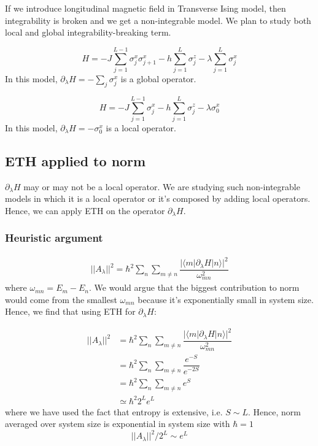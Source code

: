 \documentclass[11pt,a4paper]{article}
\begin{document}
If we introduce longitudinal magnetic field in Transverse Ising model, then integrability is broken and we get a non-integrable model. We plan to study both local  and global integrability-breaking term. 

\begin{equation}
H= -J \sum_{j=1}^{L-1} \sigma_j^x \sigma_{j+1}^x - h\sum_{j=1}^{L} \sigma_j^z -\lambda \sum_{j=1}^{L}\sigma_j^x 
\end{equation}
In this model, $\partial_{\lambda}H = - \sum_{j} \sigma_j^x  $ is a global operator.


\begin{equation}
H= -J  \sum_{j=1}^{L-1} \sigma_j^x - h \sum_{j=1}^{L}  \sigma_j^z -\lambda  \sigma_0^x 
\end{equation}
In this model, $\partial_{\lambda}H = -  \sigma_0^x  $ is a local operator.


\subsection{ETH applied to norm}
$\partial_{\lambda}H$ may or may not be a local operator. We are studying such non-integrable models in which it is a local operator or it's composed by adding local operators. Hence, we can apply ETH on the operator $\partial_{\lambda}H$.

\subsubsection{Heuristic argument}
\begin{align*}
||A_{\lambda}||^2= \hbar^2\sum_n \sum_{m \neq n}  \dfrac{|\langle m | \partial_{\lambda}H| n \rangle|^2}{\omega_{mn}^2}
\end{align*}
where $\omega_{mn}= E_m-E_n$.
We would argue that the biggest contribution to norm would come from the smallest $\omega_{mn}$ because it's exponentially small in system size. Hence, we find that using ETH for  $\partial_{\lambda}H$:

\begin{align*}
||A_{\lambda}||^2&= \hbar^2\sum_n \sum_{m \neq n}  \dfrac{|\langle m | \partial_{\lambda}H| n \rangle|^2}{\omega_{mn}^2}\\
&= \hbar^2\sum_n \sum_{m \neq n}  \dfrac{ e^{-S}}{e^{-2S}} \\
&= \hbar^2\sum_n \sum_{m \neq n}  e^{S} \\
& \simeq \hbar^2 2^L  e^{L} 
\end{align*}
where we have used the fact that entropy is extensive, i.e. $S \sim L$. Hence, norm averaged over system size is exponential in system size with $\hbar=1$
\begin{equation}
\boxed{||A_{\lambda}||^2/ 2^L \sim  e^{L} 
}
\end{equation}
\end{document}

